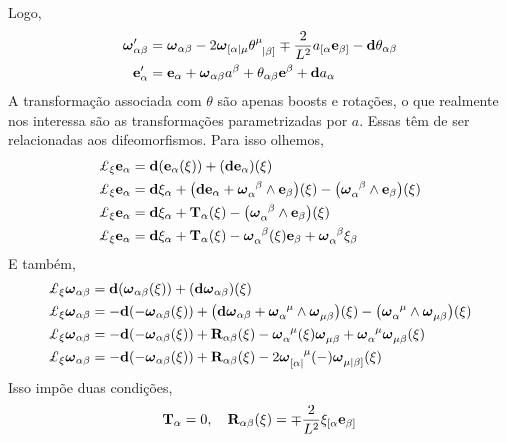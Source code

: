 Logo,
\begin{align*}
    \boldsymbol \omega_{\alpha\beta}'&=\boldsymbol \omega_{\alpha\beta}-2\boldsymbol\omega_{{[\alpha|}\mu}\tensor{\theta}{^\mu_{|\beta]}}\mp\frac{2}{L^2}a_{[\alpha}\vb e_{\beta]}-\vb d\theta_{\alpha\beta}\\
    \vb e_\alpha'&=\vb e_\alpha+\boldsymbol\omega_{\alpha\beta}a^\beta+\theta_{\alpha\beta}\vb e^\beta+\vb d a_\alpha
\end{align*}
A transformação associada com $\theta$ são apenas boosts e rotações, o que realmente nos interessa são 
as transformações parametrizadas por $a$. Essas têm de ser relacionadas aos difeomorfismos. Para isso 
olhemos,
\begin{align*}
    \pounds_\xi \vb e_\alpha&=\vb d\qty(\vb e_\alpha\qty(\xi))+\qty(\vb d\vb e_\alpha)\qty(\xi)\\
    \pounds_\xi \vb e_\alpha&=\vb d\xi_\alpha+\qty(\vb d\vb e_\alpha+\tensor{\boldsymbol\omega}{_\alpha^\beta}\wedge\vb e_\beta)\qty(\xi)-\qty(\tensor{\boldsymbol\omega}{_\alpha^\beta}\wedge\vb e_\beta)\qty(\xi)\\
    \pounds_\xi \vb e_\alpha&=\vb d\xi_\alpha+\vb T_\alpha\qty(\xi)-\qty(\tensor{\boldsymbol\omega}{_\alpha^\beta}\wedge\vb e_\beta)\qty(\xi)\\
    \pounds_\xi \vb e_\alpha&=\vb d\xi_\alpha+\vb T_\alpha\qty(\xi)-\tensor{\boldsymbol\omega}{_\alpha^\beta}\qty(\xi)\vb e_\beta+\tensor{\boldsymbol\omega}{_\alpha^\beta}\xi_\beta
\end{align*}
E também,
\begin{align*}
    \pounds_\xi \boldsymbol\omega_{\alpha\beta}&=\vb d\qty(\boldsymbol\omega_{\alpha\beta}\qty(\xi))+\qty(\vb d\boldsymbol\omega_{\alpha\beta})\qty(\xi)\\
    \pounds_\xi \boldsymbol\omega_{\alpha\beta}&=-\vb d\qty(-\boldsymbol\omega_{\alpha\beta}\qty(\xi))+\qty(\vb d\boldsymbol\omega_{\alpha\beta}+\tensor{\boldsymbol\omega}{_\alpha^\mu}\wedge\tensor{\boldsymbol\omega}{_\mu_\beta})\qty(\xi)-\qty(\tensor{\boldsymbol\omega}{_\alpha^\mu}\wedge\tensor{\boldsymbol\omega}{_\mu_\beta})\qty(\xi)\\
    \pounds_\xi \boldsymbol\omega_{\alpha\beta}&=-\vb d\qty(-\boldsymbol\omega_{\alpha\beta}\qty(\xi))+\vb R_{\alpha\beta}\qty(\xi)-\tensor{\boldsymbol\omega}{_\alpha^\mu}\qty(\xi)\tensor{\boldsymbol\omega}{_\mu_\beta}+\tensor{\boldsymbol\omega}{_\alpha^\mu}\tensor{\boldsymbol\omega}{_\mu_\beta}\qty(\xi)\\
    \pounds_\xi \boldsymbol\omega_{\alpha\beta}&=-\vb d\qty(-\boldsymbol\omega_{\alpha\beta}\qty(\xi))+\vb R_{\alpha\beta}\qty(\xi)-2\tensor{\boldsymbol\omega}{_{[\alpha|}^\mu}(-)\tensor{\boldsymbol\omega}{_\mu_{|\beta]}}\qty(\xi)
\end{align*}
Isso impõe duas condições,
\[\vb T_\alpha=0,\ \ \ \vb R_{\alpha\beta}\qty(\xi)=\mp\frac{2}{L^2}\xi_{[\alpha}\vb e_{\beta]}\]













